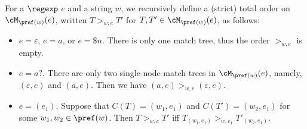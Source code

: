   \begin{definition}\label{def-regex-semantics}
  		
  	For a $\regexp$ $e$ and a string $w$, we recursively define a (strict) total order on $\cM_{\pref(w)}(e)$, written $T
  	>_{w,e} T'$ for $T, T' \in \cM_{\pref(w)}(e)$, as follows:
  	\begin{itemize}
  		\item $e = \varepsilon$, $e = a$, or $e = \$ n$. There is only one match tree, thus the
  		order $>_{w, e}$ is empty. %
 		\item $e  = a?$. There are only two single-node match trees in $\cM_{\pref(w)}(e)$, namely, $(\varepsilon, e)$ and $(a, e)$. Then we have $(a, e) >_{w,e} (\varepsilon, e)$. %
%		 		
  		\item $e = (e_1)$. Suppose that $C (T) = (w_1, e_1)$ and $C (T') = (w_2, e_1)$ for some $w_1, w_2 \in \pref(w)$.
  		Then $T >_{w,e} T'$ iff $T_{(w_1, e_1)} >_{w, e_1} T'_{(w_2, e_1)}$.
  		

\end{itemize}
\end{definition}
